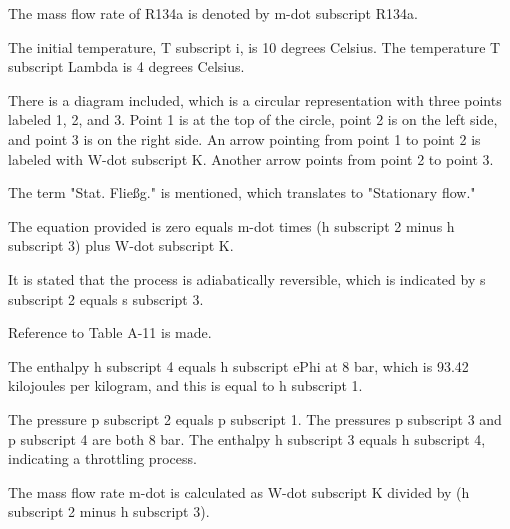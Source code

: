 The mass flow rate of R134a is denoted by m-dot subscript R134a.

The initial temperature, T subscript i, is 10 degrees Celsius.
The temperature T subscript Lambda is 4 degrees Celsius.

There is a diagram included, which is a circular representation with three points labeled 1, 2, and 3. Point 1 is at the top of the circle, point 2 is on the left side, and point 3 is on the right side. An arrow pointing from point 1 to point 2 is labeled with W-dot subscript K. Another arrow points from point 2 to point 3.

The term "Stat. Fließg." is mentioned, which translates to "Stationary flow."

The equation provided is zero equals m-dot times (h subscript 2 minus h subscript 3) plus W-dot subscript K.

It is stated that the process is adiabatically reversible, which is indicated by s subscript 2 equals s subscript 3.

Reference to Table A-11 is made.

The enthalpy h subscript 4 equals h subscript ePhi at 8 bar, which is 93.42 kilojoules per kilogram, and this is equal to h subscript 1.

The pressure p subscript 2 equals p subscript 1.
The pressures p subscript 3 and p subscript 4 are both 8 bar.
The enthalpy h subscript 3 equals h subscript 4, indicating a throttling process.

The mass flow rate m-dot is calculated as W-dot subscript K divided by (h subscript 2 minus h subscript 3).